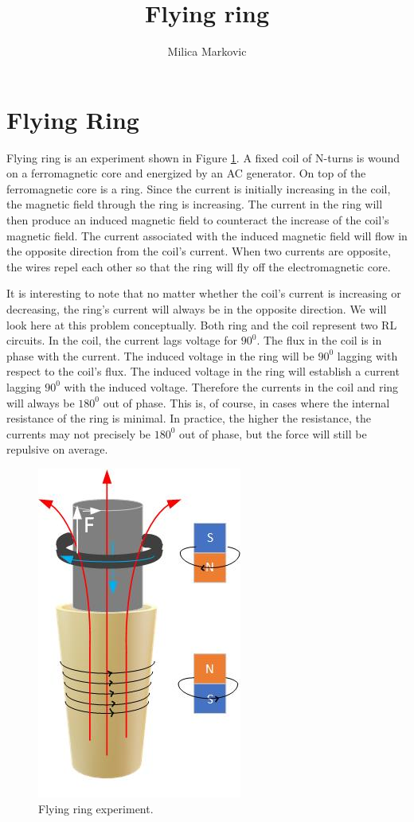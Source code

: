 \documentclass{ximera}
\title{Flying ring}
\author{Milica Markovic}
\begin{document}
  
\begin{abstract}  

\end{abstract}  
\maketitle    

\section{Flying Ring}

Flying ring is an experiment shown in Figure \ref{fig:FlyingRing}. A fixed coil of N-turns is wound on a ferromagnetic core and energized by an AC generator. On top of the ferromagnetic core is a ring. Since the current is initially increasing in the coil, the magnetic field through the ring is increasing. The current in the ring will then produce an induced magnetic field to counteract the increase of the coil's magnetic field. The current associated with the induced magnetic field will flow in the opposite direction from the coil's current. When two currents are opposite, the wires repel each other so that the ring will fly off the electromagnetic core. 

It is interesting to note that no matter whether the coil's current is increasing or decreasing, the ring's current will always be in the opposite direction. We will look here at this problem conceptually. Both ring and the coil represent two RL circuits. In the coil, the current lags voltage for $90^0$. The flux in the coil is in phase with the current. The induced voltage in the ring will be $90^0$ lagging with respect to the coil's flux. The induced voltage in the ring will establish a current lagging $90^0$ with the induced voltage. Therefore the currents in the coil and ring will always be  $180^0$ out of phase. This is, of course, in cases where the internal resistance of the ring is minimal. In practice, the higher the resistance, the currents may not precisely be $180^0$ out of phase, but the force will still be repulsive on average.



\begin{figure}[htbp]
\begin{center}
\includegraphics[scale=0.8]{../jpg/flyingRing1.jpg}
\end{center}
\caption{Flying ring experiment.}
\label{fig:FlyingRing}
\end{figure}
\end{document}
